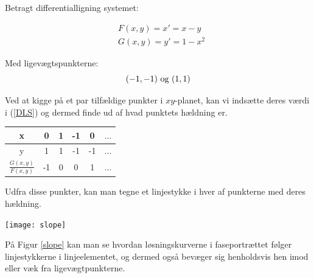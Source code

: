 \begin{Example}
\hfill \break
\textnormal{Betragt differentialligning systemet:} 

\begin{equation}\label{DLS}
    \begin{aligned}
    &F(x,y)= x'=x-y\\ 
    &G(x,y)=y'=1-x^2
    \end{aligned}
\end{equation}

\textnormal{Med ligevægtspunkterne:} $$(-1,-1) \ \textnormal{og} \ (1,1)$$
\textnormal{}

\textnormal{Ved at kigge på et par tilfældige punkter i $xy$-planet, kan vi indsætte deres værdi i (\ref{DLS}) og dermed finde ud af hvad punktets hældning er.} 

\begin{center}
  \begin{tabular}{ | c || c | c | c | c | c |}
    \hline
    x & 0 & 1 & -1 & 0 & $\hdots$ \\ \hline 
    y & 1 & 1 & -1 & -1 & $\hdots$\\ \hline \hline
    $\frac{G(x,y)}{F(x,y)}$ & -1 & 0 & 0 & 1 & $\hdots$\\ \hline
  \end{tabular}
\end{center}

\textnormal{Udfra disse punkter, kan man tegne et linjestykke i hver af punkterne med deres hældning.}

\begin{center}
\texttt{[image: slope]}
\end{center}
 \label{slope}
\hfill \break

\textnormal{På Figur \ref{slope} kan man se hvordan løsningskurverne i faseportrættet følger linjestykkerne i linjeelementet, og dermed også bevæger sig henholdsvis hen  imod eller væk fra ligevægtpunkterne.}

\end{Example}


